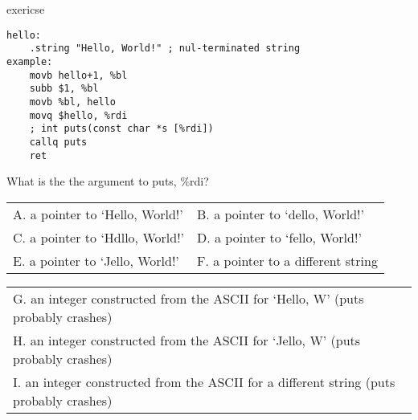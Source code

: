 \begin{frame}[fragile,label=attExercise]{exericse}
\begin{lstlisting}[language=myasm,style=smaller,morekeywords=subb,deletekeywords=bl]
hello:
    .string "Hello, World!" ; nul-terminated string
example:
    movb hello+1, %bl
    subb $1, %bl
    movb %bl, hello
    movq $hello, %rdi
    ; int puts(const char *s [%rdi])
    callq puts
    ret
\end{lstlisting}
What is the the argument to puts, \%rdi?

\small
\begin{tabular}{ll}
A. a pointer to `Hello, World!' & B. a pointer to `dello, World!' \\
C. a pointer to `Hdllo, World!' & D. a pointer to `fello, World!' \\
E. a pointer to `Jello, World!' & F. a pointer to a different string \\
\end{tabular}
\begin{tabular}{l}
G. an integer constructed from the ASCII for `Hello, W' (puts probably crashes) \\
H. an integer constructed from the ASCII for `Jello, W' (puts probably crashes) \\
I. an integer constructed from the ASCII for a different string (puts probably crashes) \\
\end{tabular}
\end{frame}
